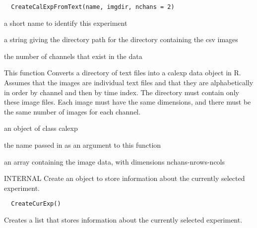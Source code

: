 \documentclass[a4paper]{book}
\begin{document}
%
\begin{Usage}
\begin{verbatim}
  CreateCalExpFromText(name, imgdir, nchans = 2)
\end{verbatim}
\end{Usage}
%
\begin{Arguments}
\begin{ldescription}
\item[\code{name}] a short name to identify this experiment

\item[\code{imgdir}] a string giving the directory path for the
directory containing the csv images

\item[\code{nchans}] the number of channels that exist in the
data
\end{ldescription}
\end{Arguments}
%
\begin{Details}\relax
This function Converts a directory of text files into a
calexp data object in R. Assumes that the images are
individual text files and that they are alphabetically in
order by channel and then by time index.  The directory
must contain only these image files. Each image must have
the same dimensions, and there must be the same number of
images for each channel.
\end{Details}
%
\begin{Value}
an object of class calexp \begin{ldescription}
\item[\code{name}] the name passed in
as an argument to this function\item[\code{data}] an array
containing the image data, with dimensions
nchans-nrows-ncols
\end{ldescription}
\end{Value}
%
\begin{Description}\relax
INTERNAL Create an object to store information about the
currently selected experiment.
\end{Description}
%
\begin{Usage}
\begin{verbatim}
  CreateCurExp()
\end{verbatim}
\end{Usage}
%
\begin{Details}\relax
Creates a list that stores information about the
currently selected experiment.
\end{Details}
\end{document}
